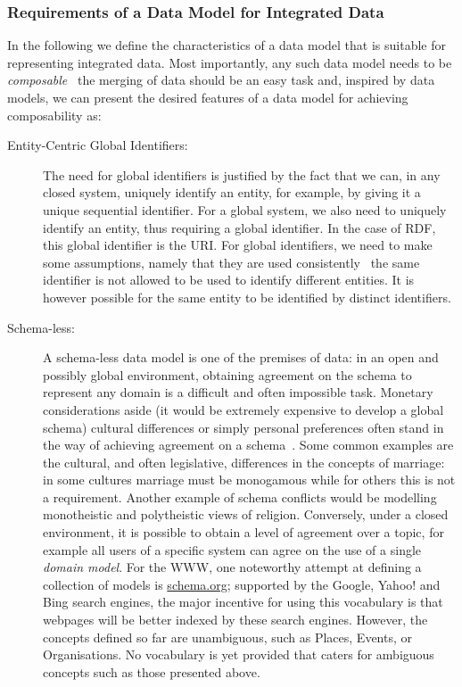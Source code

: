\subsubsection*{Requirements of a Data Model for Integrated Data}
%
In the following we define the characteristics of a data model that is suitable for representing integrated data.
%
Most importantly, any such data model needs to be \emph{composable} \ie~the merging of data should be an easy task and,
inspired by \sd data models, we can present the desired features of a data model for achieving composability as:
%
\begin{description}
\item[Entity-Centric Global Identifiers:] The need for global identifiers is justified by the fact that we can, in any
  closed system, uniquely identify an entity, for example, by giving it a unique sequential identifier.  For a global
  system, we also need to uniquely identify an entity, thus requiring a global identifier.  In the case of \ac{RDF},
  this global identifier is the \ac{URI}.  For global identifiers, we need to make some assumptions, namely that they
  are used consistently \ie~the same identifier is not allowed to be used to identify different entities.  It is however
  possible for the same entity to be identified by distinct identifiers.

\item[Schema-less:] A schema-less data model is one of the premises of \sd data: in an open and possibly global
  environment, obtaining agreement on the schema to represent any domain is a difficult and often impossible task.
  Monetary considerations aside (it would be extremely expensive to develop a global schema) cultural differences or
  simply personal preferences often stand in the way of achieving agreement on a schema~\cite{GohMadnickSiegel:1994aa}.
  Some common examples are the cultural, and often legislative, differences in the concepts of marriage: in some
  cultures marriage must be monogamous while for others this is not a requirement.  Another example of schema conflicts
  would be modelling monotheistic and polytheistic views of religion.
  Conversely, under a closed environment, it is possible to obtain a level of agreement over a topic, for example all
  users of a specific system can agree on the use of a single \emph{domain model}.
  For the \ac{WWW}, one noteworthy attempt at defining a collection of models is \url{schema.org}; supported by the
  Google, Yahoo! and Bing search engines, the major incentive for using this vocabulary is that webpages will be better
  indexed by these search engines.
  However, the concepts defined so far are unambiguous, such as Places, Events, or Organisations.  No vocabulary is yet
  provided that caters for ambiguous concepts such as those presented above.


\end{description}
